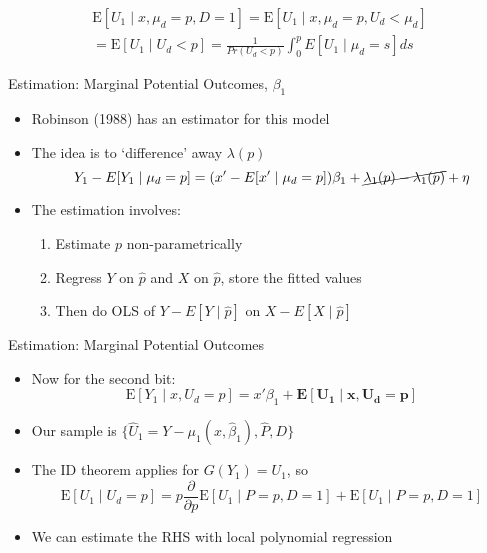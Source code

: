 \documentclass{beamer}
\begin{document}
\begin{frame}
  \begin{align*}
  \mathrm{E}[U_1\mid x,\mu_d=p,
  D=1   ] = \mathrm{E}[U_1\mid x, \mu_d=p, U_d < \mu_d    ] \\ = \mathrm{E}[U_1\mid  U_d < p    ] = \frac{1}{Pr(U_d<p)} \int_0^pE[U_1\mid \mu_d=s] ds
\end{align*}
\end{frame}

\begin{frame}{Estimation:  Marginal Potential Outcomes, $\beta_1$}
  \begin{itemize}
  \item Robinson (1988) has an estimator for this model
\item The idea is to
  `difference' away $\lambda(p)$
  \begin{equation*}
Y_1 - E[Y_1\mid \mu_d=p] = (x'-E[x'\mid \mu_d=p])\beta_1 +  \cancel{\lambda_1(p) - \lambda_1(p)} + \eta
\end{equation*}
\item The estimation involves:
\begin{enumerate}
\item Estimate ${p}$ non-parametrically
\item Regress $Y$ on $\hat{p}$ and $X$ on $\hat{p}$, store the fitted values
\item Then do OLS of $Y - E[Y\mid \hat{p}]$ on $X -
   E[X\mid \hat{p}]$
\end{enumerate}
  \end{itemize}

\end{frame}

\begin{frame}{Estimation:  Marginal Potential Outcomes }
  \begin{itemize}
  \item Now for the second bit: \begin{equation*}
      \mathrm{E}[Y_1\mid x,U_d=p]  = x'\beta_1 +  \mathbf{\mathrm{\mathbf{E}}[U_1\mid x,U_d=p]}
    \end{equation*}
\item Our sample is $\{\hat{U}_1= Y-\mu_1(x,\hat{\beta}_1), \hat{P},
  D\}$
\item The ID theorem applies for $G(Y_1)=U_1$, so
\begin{equation*}
  \mathrm{E}[U_1\mid U_d= p] = p \frac{\partial}{\partial
    p}\mathrm{E}[U_1\mid P=p,D=1] + \mathrm{E}[U_1\mid P=p,D=1]
\end{equation*}
\item We can estimate the RHS with local polynomial regression
  \end{itemize}

\end{frame}
\end{document}
